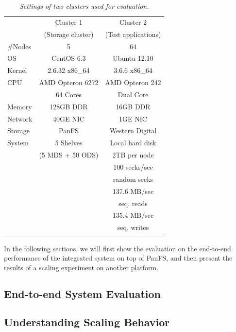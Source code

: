 \begin{footnotesize}
\begin{table}
\center
\begin{tabular}{lcc}
\toprule
      & Cluster 1 & Cluster 2 \\
      & (Storage cluster) & (Test applications)\\
\midrule
\#Nodes & 5 & 64 \\
\hline
OS &   CentOS 6.3 &  Ubuntu 12.10 \\
Kernel & 2.6.32 x86\_64 & 3.6.6 x86\_64 \\
\hline
CPU & AMD Opteron 6272 &  AMD Opteron 242 \\
    & 64 Cores & Dual Core\\
\hline
Memory & 128GB DDR &  16GB DDR \\
\hline
Network & 40GE NIC &  1GE NIC  \\
\hline
Storage & PanFS & Western Digital \\
System &      5 Shelves & Local hard disk  \\
       &   (5 MDS + 50 ODS) &  2TB per node  \\
\hline
& & 100 seeks/sec \\
& & random seeks   \\
& & 137.6 MB/sec  \\
& & seq. reads    \\
& & 135.4 MB/sec  \\
& & seq. writes   \\
\bottomrule \\
\end{tabular}
\caption{
\textit{\footnotesize Settings of two clusters used for evaluation.}
}
\label{tab:setting}
\end{table}
\end{footnotesize}

In the following sections, we will first show the evaluation
on the end-to-end performance of the integrated system on top of PanFS,
and then present the results of a scaling experiment on another platform.

\subsection{End-to-end System Evaluation}
\label{sec:fullsystem}


\subsection{Understanding Scaling Behavior}


